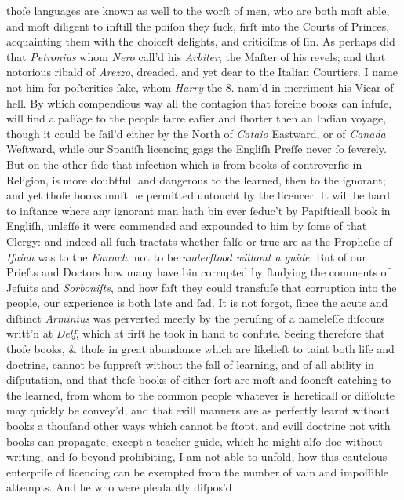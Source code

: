 thoſe languages are known as well to the worſt of men, who are both moſt able,
and moſt diligent to inſtill the poiſon they ſuck, firſt into the Courts of
Princes, acquainting them with the choiceſt delights, and criticiſms of ſin.  As
perhaps did that \textit{Petronius} whom \textit{Nero} call'd his
\textit{Arbiter}, the Maſter of his revels; and that notorious ribald of
\textit{Arezzo}, dreaded, and yet dear to the Italian Courtiers.  I name not him
for poſterities ſake, whom \textit{Harry} the 8. nam'd in merriment his Vicar of
hell.  By which compendious way all the contagion that foreine books can infuſe,
will find a paſſage to the people farre eaſier and ſhorter then an Indian
voyage, though it could be ſail'd either by the North of \textit{Cataio}
Eastward, or of \textit{Canada} Weſtward, while our Spaniſh licencing gags the
Engliſh Preſſe never ſo ſeverely.  But on the other ſide that infection which is
from books of controverſie in Religion, is more doubtfull and dangerous to the
learned, then to the ignorant; and yet thoſe books muſt be permitted untoucht by
the licencer.  It will be hard to inſtance where any ignorant man hath bin ever
ſeduc't by Papiſticall book in Engliſh, unleſſe it were commended and expounded
to him by ſome of that Clergy: and indeed all ſuch tractats whether falſe or
true are as the Propheſie of \textit{Iſaiah} was to the \textit{Eunuch}, not to
be \textit{underſtood without a guide}.  But of our Prieſts and Doctors how many
have bin corrupted by ſtudying the comments of Jeſuits and \textit{Sorboniſts},
and how faſt they could transfuſe that corruption into the people, our
experience is both late and ſad.  It is not forgot, ſince the acute and diſtinct
\textit{Arminius} was perverted meerly by the peruſing of a nameleſſe diſcours
writt'n at \textit{Delf}, which at firſt he took in hand to confute.  Seeing
therefore that thoſe books, \& thoſe in great abundance which are likelieſt to
taint both life and doctrine, cannot be ſuppreſt without the fall of learning,
and of all ability in diſputation, and that theſe books of either ſort are moſt
and ſooneſt catching to the learned, from whom to the common people whatever is
hereticall or diſſolute may quickly be convey'd, and that evill manners are as
perfectly learnt without books a thouſand other ways which cannot be ſtopt, and
evill doctrine not with books can propagate, except a teacher guide, which he
might alſo doe without writing, and ſo beyond prohibiting, I am not able to
unfold, how this cautelous enterpriſe of licencing can be exempted from the
number of vain and impoſſible attempts.  And he who were pleaſantly diſpos'd
